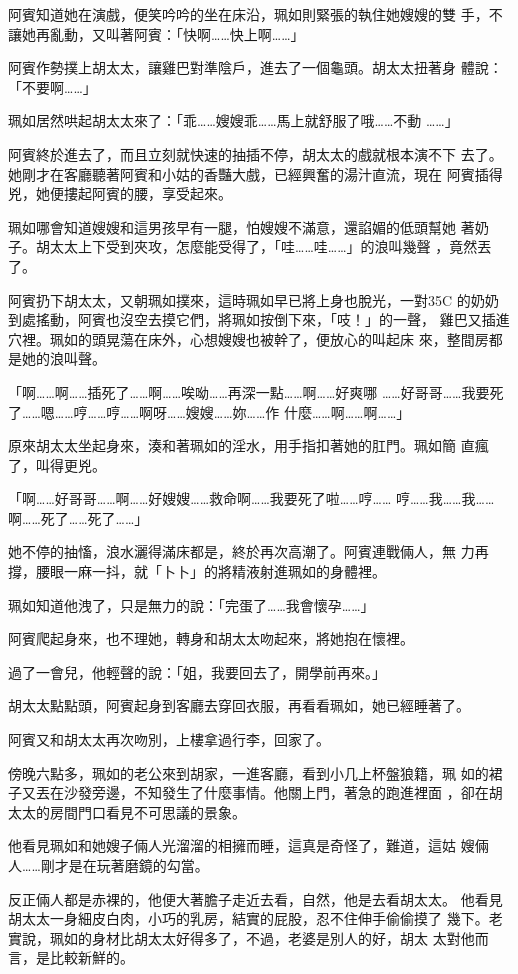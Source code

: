 阿賓知道她在演戲，便笑吟吟的坐在床沿，珮如則緊張的執住她嫂嫂的雙
手，不讓她再亂動，又叫著阿賓：「快啊……快上啊……」

阿賓作勢撲上胡太太，讓雞巴對準陰戶，進去了一個龜頭。胡太太扭著身
體說：「不要啊……」

珮如居然哄起胡太太來了：「乖……嫂嫂乖……馬上就舒服了哦……不動
……」

阿賓終於進去了，而且立刻就快速的抽插不停，胡太太的戲就根本演不下
去了。她剛才在客廳聽著阿賓和小姑的香豔大戲，已經興奮的湯汁直流，現在
阿賓插得兇，她便摟起阿賓的腰，享受起來。

珮如哪會知道嫂嫂和這男孩早有一腿，怕嫂嫂不滿意，還諂媚的低頭幫她
著奶子。胡太太上下受到夾攻，怎麼能受得了，「哇……哇……」的浪叫幾聲
，竟然丟了。

阿賓扔下胡太太，又朝珮如撲來，這時珮如早已將上身也脫光，一對35C
的奶奶到處搖動，阿賓也沒空去摸它們，將珮如按倒下來，「吱！」的一聲，
雞巴又插進穴裡。珮如的頭晃蕩在床外，心想嫂嫂也被幹了，便放心的叫起床
來，整間房都是她的浪叫聲。

「啊……啊……插死了……啊……唉呦……再深一點……啊……好爽哪
……好哥哥……我要死了……嗯……哼……哼……啊呀……嫂嫂……妳……作
什麼……啊……啊……」

原來胡太太坐起身來，湊和著珮如的淫水，用手指扣著她的肛門。珮如簡
直瘋了，叫得更兇。

「啊……好哥哥……啊……好嫂嫂……救命啊……我要死了啦……哼……
哼……我……我……啊……死了……死了……」

她不停的抽慉，浪水灑得滿床都是，終於再次高潮了。阿賓連戰倆人，無
力再撐，腰眼一麻一抖，就「卜卜」的將精液射進珮如的身體裡。

珮如知道他洩了，只是無力的說：「完蛋了……我會懷孕……」

阿賓爬起身來，也不理她，轉身和胡太太吻起來，將她抱在懷裡。

過了一會兒，他輕聲的說：「姐，我要回去了，開學前再來。」

胡太太點點頭，阿賓起身到客廳去穿回衣服，再看看珮如，她已經睡著了。

阿賓又和胡太太再次吻別，上樓拿過行李，回家了。

傍晚六點多，珮如的老公來到胡家，一進客廳，看到小几上杯盤狼籍，珮
如的裙子又丟在沙發旁邊，不知發生了什麼事情。他關上門，著急的跑進裡面
，卻在胡太太的房間門口看見不可思議的景象。

他看見珮如和她嫂子倆人光溜溜的相擁而睡，這真是奇怪了，難道，這姑
嫂倆人……剛才是在玩著磨鏡的勾當。

反正倆人都是赤裸的，他便大著膽子走近去看，自然，他是去看胡太太。
他看見胡太太一身細皮白肉，小巧的乳房，結實的屁股，忍不住伸手偷偷摸了
幾下。老實說，珮如的身材比胡太太好得多了，不過，老婆是別人的好，胡太
太對他而言，是比較新鮮的。

